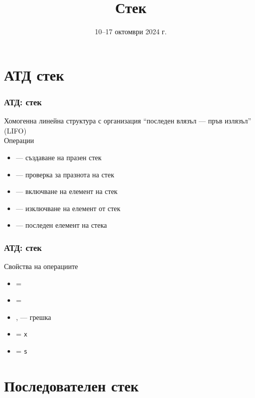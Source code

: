 \documentclass[alsotrans, beameroptions={aspectratio=169}]{beamerswitch}
\title{Стек}
\date{10--17 октомври 2024 г.}
\begin{document}
\begin{frame}
  \titlepage
\end{frame}

\section{АТД стек}

\begin{frame}
  \frametitle{АТД: стек}

  Хомогенна линейна структура с организация ``последен влязъл --- пръв излязъл'' (LIFO)\\[2ex]
  Операции\\[1ex]
  \begin{itemize}
  \item {} --- създаване на празен стек
  \item {} --- проверка за празнота на стек
  \item {} --- включване на елемент на стек
  \item {} --- изключване на елемент от стек
  \item {} --- последен елемент на стека
  \end{itemize}
\end{frame}

\begin{frame}
  \frametitle{АТД: стек}

  Свойства на операциите\\[1ex]
  \begin{itemize}
  \item {} = 
  \item {} = 
  \item {},  --- \alert{грешка}
  \item {} = \tt x
  \item {} = \tt s
  \end{itemize}
\end{frame}

\section{Последователен стек}
\end{document}
